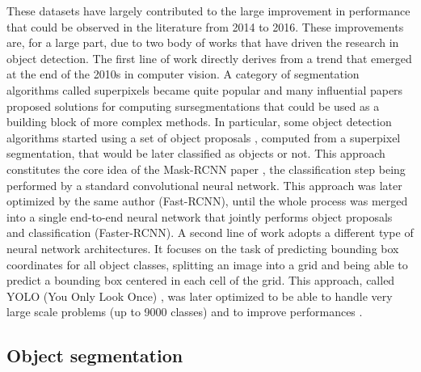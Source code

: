 These datasets have largely contributed to the large improvement in performance that could be observed in the literature from 2014 to 2016. These improvements are, for a large part, due to two body of works that have driven the research in object detection. The first line of work directly derives from a trend that emerged at the end of the 2010s in computer vision. A category of segmentation algorithms called superpixels became quite popular and many influential papers \cite{felzenszwalb2004efficient, achanta2012slic, levinshtein2009turbopixels} proposed solutions for computing sursegmentations that could be used as a building block of more complex methods. In particular, some object detection algorithms started using a set of object proposals \cite{uijlings2013selective}, computed from a superpixel segmentation, that would be later classified as objects or not. This approach constitutes the core idea of the Mask-RCNN paper \cite{girshick2014maskrcnn}, the classification step being performed by a standard convolutional neural network. This approach was later optimized by the same author \cite{girshick2014fastrcnn} (Fast-RCNN), until the whole process was merged into a single end-to-end neural network that jointly performs object proposals and classification \cite{ren2015faster} (Faster-RCNN). A second line of work adopts a different type of neural network architectures. It focuses on the task of predicting bounding box coordinates for all object classes, splitting an image into a grid and being able to predict a bounding box centered in each cell of the grid. This approach, called YOLO (You Only Look Once) \cite{redmon2016you}, was later optimized to be able to handle very large scale problems \cite{redmon2017yolo9000} (up to 9000 classes) and to improve performances \cite{redmon2018yolov3}. 

\subsection{Object segmentation}

